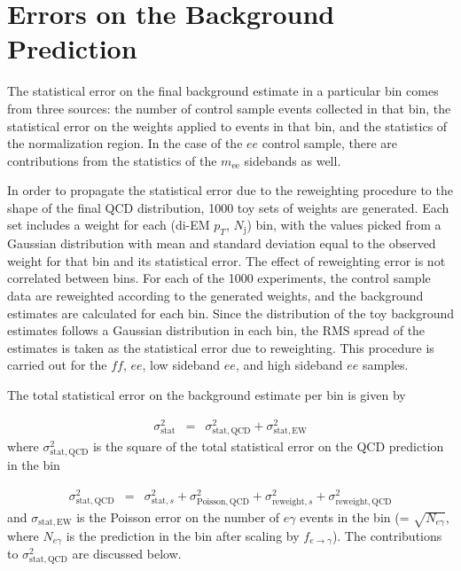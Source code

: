 \documentclass[dissertation.tex]{subfiles}
\begin{document}
\section{Errors on the Background Prediction}
\label{sec:Errors on the Background Prediction}

The statistical error on the final background estimate in a particular \MET bin comes from three sources: the number of control sample events collected in that bin, the statistical error on the weights applied to events in that bin, and the statistics of the normalization region.  In the case of the $ee$ control sample, there are contributions from the statistics of the $m_{\mathrm{ee}}$ sidebands as well.

In order to propagate the statistical error due to the reweighting procedure to the shape of the final QCD \MET distribution, 1000 toy sets of weights are generated.  Each set includes a weight for each (di-EM $p_{T}$, $N_{\mathrm{j}}$) bin, with the values picked from a Gaussian distribution with mean and standard deviation equal to the observed weight for that bin and its statistical error.  The effect of reweighting error is not correlated between \MET bins.  For each of the 1000 experiments, the control sample data are reweighted according to the generated weights, and the background estimates are calculated for each \MET bin.  Since the distribution of the toy background estimates follows a Gaussian distribution in each \MET bin, the RMS spread of the estimates is taken as the statistical error due to reweighting.  This procedure is carried out for the $\mathit{ff}$, $ee$, low sideband $ee$, and high sideband $ee$ samples.

The total statistical error on the background estimate per \MET bin is given by

\begin{eqnarray}
\sigma_{\mathrm{stat}}^{2} &=& \sigma_{\mathrm{stat,QCD}}^{2} + \sigma_{\mathrm{stat,EW}}^{2}
\label{eq:total_stat_error}
\end{eqnarray}
%
where $\sigma_{\mathrm{stat,QCD}}^{2}$ is the square of the total statistical error on the QCD prediction in the \MET bin

\begin{eqnarray}
\sigma_{\mathrm{stat,QCD}}^{2} &=& \sigma_{\mathrm{stat,}s}^{2} + \sigma_{\mathrm{Poisson,QCD}}^{2} + \sigma_{\mathrm{reweight,}s}^{2} + \sigma_{\mathrm{reweight,QCD}}^{2}
\label{eq:QCD_stat_error}
\end{eqnarray}
%
and $\sigma_{\mathrm{stat,EW}}$ is the Poisson error on the number of $e\gamma$ events in the \MET bin (= $\sqrt{N_{e\gamma}}$, where $N_{e\gamma}$ is the prediction in the \MET bin after scaling by $f_{e\rightarrow\gamma}$).  The contributions to $\sigma_{\mathrm{stat,QCD}}^{2}$ are discussed below.
\end{document}
